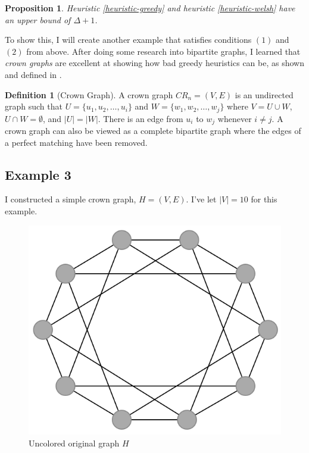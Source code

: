 \documentclass{article}
\newcounter{heuristic} \setcounter{heuristic}{0}
\newtheorem{prop}{Proposition}
\theoremstyle{definition}
\newtheorem{definition}{Definition}
\begin{document}
\begin{prop}
Heuristic \ref{heuristic-greedy} and heuristic \ref{heuristic-welsh} have an upper bound of \(\Delta + 1\).
\end{prop}

To show this, I will create another example that satisfies conditions \((1)\) and \((2)\) from above. After doing some research into bipartite graphs, I learned that \emph{crown graphs} are excellent at showing how bad greedy heuristics can be, as shown and defined in \cite{kordecki}.

\begin{definition}[Crown Graph]
A crown graph \(CR_n = (V, E)\) is an undirected graph such that \(U = \{u_1, u_2, \dots, u_i\}\) and \(W = \{w_1, w_2, \dots, w_j\}\) where \(V = U \cup W\), \(U \cap W = \emptyset\), and \(|U| = |W|\). There is an edge from \(u_i\) to \(w_j\) whenever \(i \neq j\). A crown graph can also be viewed as a complete bipartite graph where the edges of a perfect matching have been removed.
\end{definition}

\subsection*{Example 3}

I constructed a simple crown graph, \(H = (V, E)\). I've let \(|V| = 10\) for this example.

\begin{figure}[H]
\centering
\includegraphics[scale=0.38]{images/graph-4.png}
\caption{Uncolored original graph \(H\)}
\end{figure}
\end{document}
